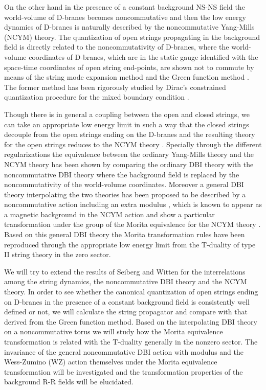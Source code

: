 \documentclass[12pt,a4paper]{article}
\begin{document}
On the other hand in the presence of a constant background NS-NS \coordHE{} field
the world-volume of D-branes becomes noncommutative \cite{DH,AAS,CH}
and then the low energy dynamics of D-branes is naturally described by 
the noncommutative Yang-Mills (NCYM) theory. The quantization of open
strings propagating in the background \coordHE{} field is directly related to the
noncommutativity of D-branes, where the world-volume coordinates of 
D-branes, which are in the static gauge identified with
 the space-time coordinates of open string 
end-points, are shown not to commute by means of the string mode expansion
method \cite{AAS,CH,FZ} and the Green function method \cite{SW}. 
The former method has been rigorously studied 
by Dirac's constrained quantization
procedure for the mixed boundary condition \cite{ACKL}.

Though there is in general a coupling between the open and closed strings,
we can take an appropriate low energy limit in such a way that the closed
strings decouple from the open strings ending on the D-branes
and the resulting theory for the open strings reduces to
the NCYM theory \cite{SW}. Specially through the different 
regularizations the equivalence between the ordinary Yang-Mills theory 
and the NCYM theory has been shown by comparing the ordinary DBI theory
with the noncommutative DBI theory where the background \coordHE{} field is 
replaced by the noncommutativity of the world-volume coordinates.
Moreover a general DBI theory interpolating the two theories has been 
proposed to be described by a noncommutative action including an extra 
modulus \myHighlight{$\Phi$}\coordHE{}, which is known to appear as a magnetic background
in the NCYM action and show a
particular transformation under the group of the Morita equivalence for
the NCYM theory \cite{KS,PS}. Based on this general DBI theory the 
Morita transformation rules have been reproduced through the appropriate
low energy limit from the T-duality of type II string theory in the zero
\myHighlight{$\Phi$}\coordHE{} sector.

We will try to extend the results of Seiberg and Witten \cite{SW} for 
the interrelations among the string dynamics, the noncommutative DBI 
theory and the NCYM theory. In order to see whether the canonical
quantization of open strings ending on D-branes in the presence of a 
constant background \coordHE{} field \cite{CH} 
is consistently well defined or not, we will calculate the string 
propagator and compare with that derived from
the Green function method. Based on the interpolating DBI theory on a 
noncommutative torus we will study how the Morita equivalence 
transformation is related with the T-duality generally in the nonzero
\myHighlight{$\Phi$}\coordHE{} sector. The invariance of 
the general noncommutative DBI action with
modulus \myHighlight{$\Phi$}\coordHE{} and the Wess-Zumino (WZ) action themselves under 
the Morita equivalence transformation will be investigated and 
the transformation properties of the  background R-R fields will 
be elucidated.
\end{document}

